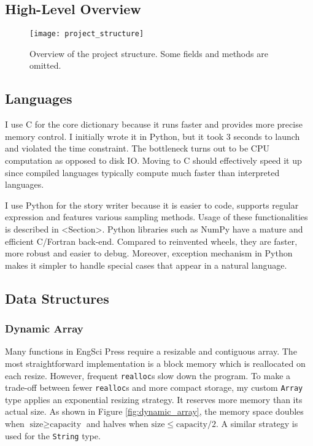\documentclass[../main.tex]{subfiles}
\begin{document}
\subsection{High-Level Overview}

\begin{figure}
	\centering
	\texttt{[image: project\_structure]}
	\caption{Overview of the project structure. Some fields and methods are omitted.}
	\label{fig:project_structure}
\end{figure}

\subsection{Languages}

I use C for the core dictionary because it runs faster and provides more precise memory control. I initially wrote it in Python, but it took 3 seconds to launch and violated the time constraint. The bottleneck turns out to be CPU computation as opposed to disk IO. Moving to C should effectively speed it up since compiled languages typically compute much faster than interpreted languages.

I use Python for the story writer because it is easier to code, supports regular expression and features various sampling methods. Usage of these functionalities is described in <Section>. Python libraries such as NumPy have a mature and efficient C/Fortran back-end. Compared to reinvented wheels, they are faster, more robust and easier to debug. Moreover, exception mechanism in Python makes it simpler to handle special cases that appear in a natural language.

\subsection{Data Structures}

\subsubsection{Dynamic Array}

Many functions in EngSci Press require a resizable and contiguous array. The most straightforward implementation is a block memory which is reallocated on each resize. However, frequent \texttt{realloc}s slow down the program. To make a trade-off between fewer \texttt{realloc}s and more compact storage, my custom \texttt{Array} type applies an exponential resizing strategy. It reserves more memory than its actual size. As shown in Figure \ref{fig:dynamic_array}, the memory space doubles when $\textrm{size} \geq \textrm{capacity}$ and halves when $\textrm{size} \leq \textrm{capacity} / 2$. A similar strategy is used for the \texttt{String} type.
\end{document}
